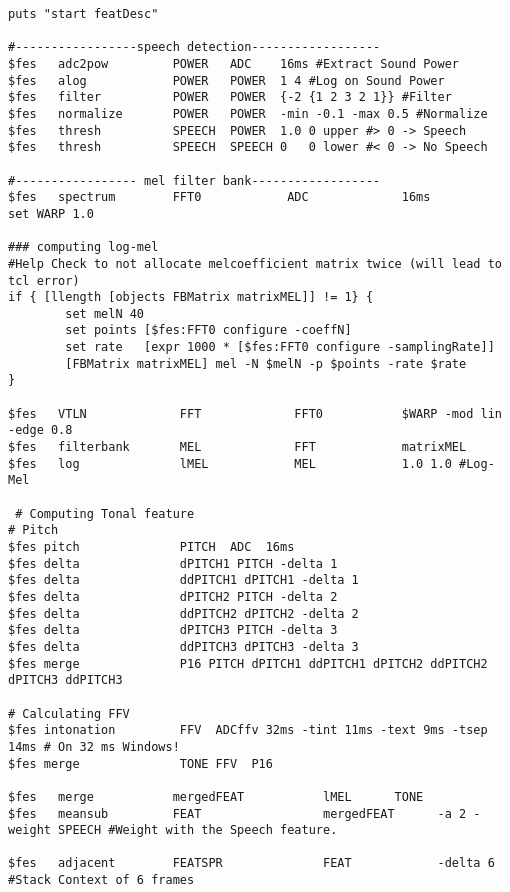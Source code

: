 \begin{lstlisting}[label=lst:features,caption=The feature description as used by our pre-BNF-preprocessing]
puts "start featDesc"

#-----------------speech detection------------------
$fes   adc2pow         POWER   ADC    16ms #Extract Sound Power
$fes   alog            POWER   POWER  1 4 #Log on Sound Power
$fes   filter          POWER   POWER  {-2 {1 2 3 2 1}} #Filter
$fes   normalize       POWER   POWER  -min -0.1 -max 0.5 #Normalize
$fes   thresh          SPEECH  POWER  1.0 0 upper #> 0 -> Speech
$fes   thresh          SPEECH  SPEECH 0   0 lower #< 0 -> No Speech

#----------------- mel filter bank------------------
$fes   spectrum        FFT0            ADC             16ms
set WARP 1.0
        
### computing log-mel
#Help Check to not allocate melcoefficient matrix twice (will lead to tcl error)
if { [llength [objects FBMatrix matrixMEL]] != 1} {
        set melN 40
        set points [$fes:FFT0 configure -coeffN]
        set rate   [expr 1000 * [$fes:FFT0 configure -samplingRate]]
        [FBMatrix matrixMEL] mel -N $melN -p $points -rate $rate
}

$fes   VTLN             FFT             FFT0           $WARP -mod lin -edge 0.8
$fes   filterbank       MEL             FFT            matrixMEL
$fes   log              lMEL            MEL            1.0 1.0 #Log-Mel

 # Computing Tonal feature
# Pitch
$fes pitch              PITCH  ADC  16ms
$fes delta              dPITCH1 PITCH -delta 1
$fes delta              ddPITCH1 dPITCH1 -delta 1
$fes delta              dPITCH2 PITCH -delta 2
$fes delta              ddPITCH2 dPITCH2 -delta 2
$fes delta              dPITCH3 PITCH -delta 3
$fes delta              ddPITCH3 dPITCH3 -delta 3
$fes merge              P16 PITCH dPITCH1 ddPITCH1 dPITCH2 ddPITCH2 dPITCH3 ddPITCH3

# Calculating FFV
$fes intonation         FFV  ADCffv 32ms -tint 11ms -text 9ms -tsep 14ms # On 32 ms Windows!
$fes merge              TONE FFV  P16

$fes   merge           mergedFEAT           lMEL      TONE
$fes   meansub         FEAT                 mergedFEAT      -a 2 -weight SPEECH #Weight with the Speech feature.

$fes   adjacent        FEATSPR              FEAT            -delta 6 #Stack Context of 6 frames
\end{lstlisting}



